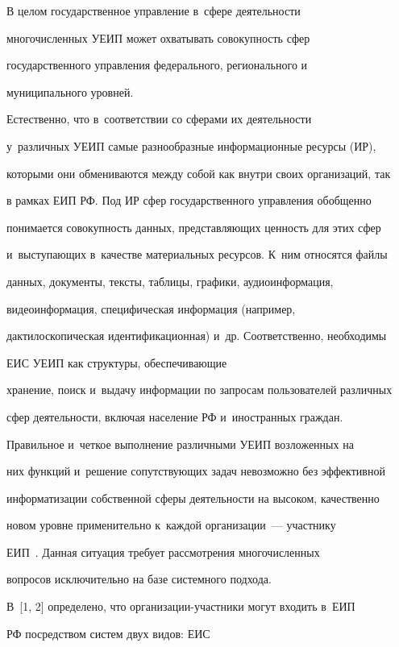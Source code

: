      В целом государственное управление в~сфере деятельности 

многочисленных УЕИП может охватывать совокупность сфер 

государственного управления федерального, регионального и~

муниципального уровней.

     

     Естественно, что в~соответствии со сферами их деятельности 

     у~различных УЕИП самые разнообразные информационные ресурсы (ИР), 

которыми они обмениваются между собой как внутри своих организаций, так 

в рамках ЕИП РФ. Под ИР сфер государственного управления обобщенно 

понимается совокупность данных, представляющих ценность для этих сфер 

и~выступающих в~качестве материальных ресурсов. К~ним относятся файлы 

данных, документы, тексты, таблицы, графики, аудиоинформация, 

видеоинформация, специфическая информация (например, 

дактилоскопическая идентификационная) и~др. Соответственно, необходимы 

ЕИС УЕИП как структуры, обеспечивающие 

хранение, поиск и~выдачу информации по запросам пользователей различных 

сфер деятельности, включая население РФ и~иностранных граждан.

     

     Правильное и~четкое выполнение различными УЕИП возложенных на 

них функций и~решение сопутствующих задач невозможно без эффективной 

информатизации собственной сферы деятельности на высоком, качественно 

новом уровне применительно к~каждой организации~--- участнику 

ЕИП~\cite{7-zk}. Данная ситуация требует рассмотрения многочисленных 

вопросов исключительно на базе системного подхода.

     

     В~[1, 2] определено, что организации-участники могут входить в~ЕИП 

РФ посредством систем двух видов: ЕИС 

